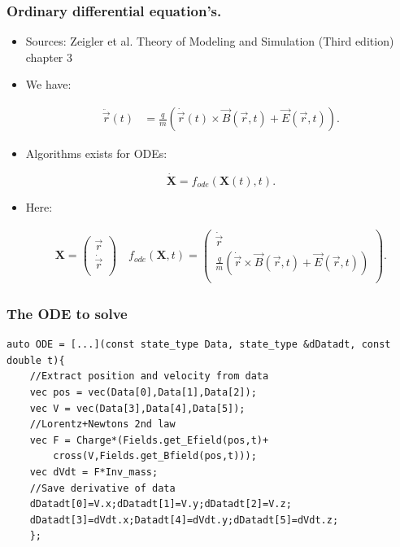 \documentclass{beamer}
\newcommand{\mvec}[2]{
\ensuremath{\left(
\begin{array}{c}
#1\\
#2\\
\end{array}
\right)}
}
\begin{document}
\begin{frame}
\frametitle{Ordinary differential equation's.}
\begin{itemize}
\item<1-> {\color{gray} Sources: Zeigler et al. Theory of Modeling and Simulation (Third edition) chapter 3}

\item<1-> We have:

\begin{align*}
\ddot{\vec{r}}(t) &= \frac{q}{m} ( \dot{\vec{r}}(t)\times \vec{B}(\vec{r},t)+\vec{E}(\vec{r},t)).
\end{align*}

\item<2-> Algorithms exists for ODEs:

\begin{equation*}
\dot{\mathbf{X}} = f_{ode}(\mathbf{X}(t),t).
\end{equation*}


\item<3-> Here:

\begin{align*}
\mathbf{X} = \mvec{\vec{r}}{\dot{\vec{r}}} \quad f_{ode}(\mathbf{X},t) = \mvec{\dot{\vec{r}}}{\frac{q}{m} ( \dot{\vec{r}}\times \vec{B}(\vec{r},t)+\vec{E}(\vec{r},t))}.
\end{align*}
\end{itemize}
\end{frame}

\begin{frame}[fragile]
\frametitle{The ODE to solve}
\begin{lstlisting}
auto ODE = [...](const state_type Data, state_type &dDatadt, const double t){
    //Extract position and velocity from data
    vec pos = vec(Data[0],Data[1],Data[2]);
    vec V = vec(Data[3],Data[4],Data[5]);
    //Lorentz+Newtons 2nd law
    vec F = Charge*(Fields.get_Efield(pos,t)+
        cross(V,Fields.get_Bfield(pos,t)));
    vec dVdt = F*Inv_mass;
    //Save derivative of data
    dDatadt[0]=V.x;dDatadt[1]=V.y;dDatadt[2]=V.z;
    dDatadt[3]=dVdt.x;Datadt[4]=dVdt.y;dDatadt[5]=dVdt.z;
    };
\end{lstlisting}
\end{frame}
\end{document}

